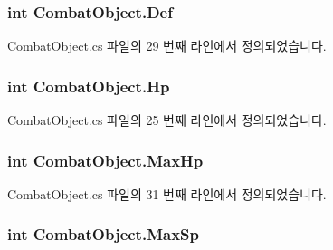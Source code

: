\subsubsection[{\texorpdfstring{Def}{Def}}]{\setlength{\rightskip}{0pt plus 5cm}int Combat\+Object.\+Def\hspace{0.3cm}{\ttfamily [get]}}\hypertarget{class_combat_object_a9c4572f9571e28d069538807ddefc567}{}\label{class_combat_object_a9c4572f9571e28d069538807ddefc567}


Combat\+Object.\+cs 파일의 29 번째 라인에서 정의되었습니다.

\subsubsection[{\texorpdfstring{Hp}{Hp}}]{\setlength{\rightskip}{0pt plus 5cm}int Combat\+Object.\+Hp\hspace{0.3cm}{\ttfamily [get]}}\hypertarget{class_combat_object_aa55597fe00c9fa9f3ff701313ffee7ae}{}\label{class_combat_object_aa55597fe00c9fa9f3ff701313ffee7ae}


Combat\+Object.\+cs 파일의 25 번째 라인에서 정의되었습니다.

\subsubsection[{\texorpdfstring{Max\+Hp}{MaxHp}}]{\setlength{\rightskip}{0pt plus 5cm}int Combat\+Object.\+Max\+Hp\hspace{0.3cm}{\ttfamily [get]}}\hypertarget{class_combat_object_a7101559cd03a4e1d635425dc086f7da6}{}\label{class_combat_object_a7101559cd03a4e1d635425dc086f7da6}


Combat\+Object.\+cs 파일의 31 번째 라인에서 정의되었습니다.

\subsubsection[{\texorpdfstring{Max\+Sp}{MaxSp}}]{\setlength{\rightskip}{0pt plus 5cm}int Combat\+Object.\+Max\+Sp\hspace{0.3cm}{\ttfamily [get]}}\hypertarget{class_combat_object_aa515c86e379dd5300b036a662587b9d6}{}\label{class_combat_object_aa515c86e379dd5300b036a662587b9d6}


